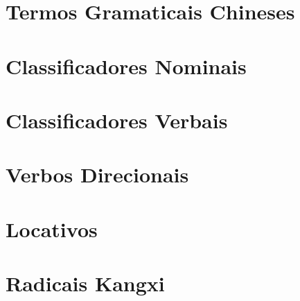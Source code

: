 \documentclass[a4paper,9pt,twoside,openright,book]{memoir}
\begin{document}
\onecolumn

\ifdraftdoc
\else

\clearpage
\pagestyle{plain}
\chapter{Termos Gramaticais Chineses}


\clearpage
\pagestyle{plain}
\chapter{Classificadores Nominais}


\clearpage
\pagestyle{plain}
\chapter{Classificadores Verbais}


\clearpage
\pagestyle{plain}
\chapter{Verbos Direcionais}


\clearpage
\pagestyle{plain}
\chapter{Locativos}


\clearpage
\pagestyle{plain}
\chapter{Radicais Kangxi}


\fi
\end{document}
